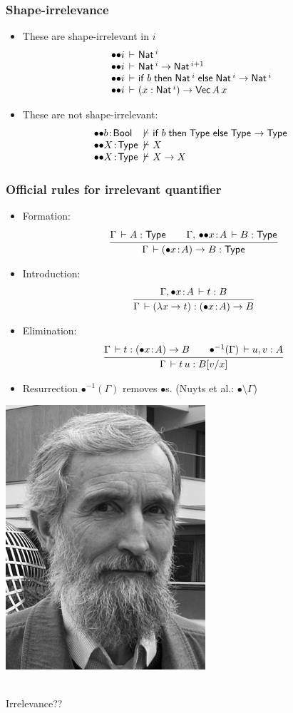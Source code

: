 \documentclass[t,fleqn]{beamer}
\makeatletter
\renewcommand{\ru}[2]{\dfrac{\begin{array}[b]{@{}c@{}} #1 \end{array}}{\begin{array}[t]{@{}l@{}} #2 \end{array}}}
\newcommand{\cAnn}{\color{red!80!black}}%
\renewcommand{\emph}[1]{{\cAnn#1}}
\newcommand{\irr}{\mathord{\bullet}}
\newcommand{\shirr}{\mathord{{\bullet}{\bullet}}}
\renewcommand{\erhyp}[3][\irr]{#1#2 \of #3}
\newcommand{\shirrhyp}{\erhyp[\shirr]}
\renewcommand{\erfunT}[4][\irr]{(\erhyp[#1]{#2}{#3}) \to #4}
\renewcommand{\resurrect}[1]{\irr^{-1}(#1)}
\newcommand{\mlsays}[1]{
\begin{frame}%
  \begin{minipage}[c]{0.5\linewidth}
   \includegraphics[height=0.9\textheight]{martin-loef-bw.png}
  \end{minipage}%
  \begin{minipage}[c]{0.5\linewidth}
   \begin{center}
     \bla \\[8ex]
     \Huge #1
   \end{center}
  \end{minipage}
\end{frame}
}
\makeatother
\begin{document}
\begin{frame}%
  \frametitle{Shape-irrelevance}
\vspace{-2ex}
  \begin{itemize}
  \item These are shape-irrelevant in $i$
\[
\begin{array}{@{\shirr i \der~}l}
  \Nat^i
\\
  \Nat^i \to \Nat^{i+1}
\\
  \tifthenelse b {\Nat^i} {\Nat^i \to \Nat^i}
\\
  (x : \Nat^i) \to \mathsf{Vec}\,A\,x
\end{array}
\]
  \item These are \emph{not} shape-irrelevant:
\[
\begin{array}{@{\shirr}l@{~\not\der~}l}
  b \of \Bool  & \tifthenelse b {\Type} {\Type \to \Type}
\\
  X \of \Type & X
\\
  X \of \Type & X \to X
\\
\end{array}
\]
  \end{itemize}
\end{frame}


\begin{frame}%
  \frametitle{Official rules for irrelevant quantifier}
  \begin{itemize}
  \item Formation:
\[
  \ru{\Gamma \der A : \Type \qquad
      \Gamma,\, \shirrhyp x A \der B : \Type
    }{\Gamma \der \erfunT x A B : \Type}
\]
\vspace{-2ex}
  \item Introduction:
\[
  \ru{\Gamma, \erhyp x A \der t : B
    }{\Gamma \der (\lambda x \to t) : \erfunT x A B}
\]
\vspace{-2ex}
  \item Elimination:
\[
  \ru{\Gamma \der t : \erfunT x A B \qquad
      \resurrect \Gamma \der u,v : A
    }{\Gamma \der t\,u : B[v/x]}
\]
\vspace{-2ex}
  \item \emph{Resurrection} $\resurrect \Gamma$ removes $\bullet$s.
  (Nuyts et al.: $\bullet \setminus \Gamma$)
  \end{itemize}
\end{frame}


\mlsays{Irrelevance??}
\end{document}
